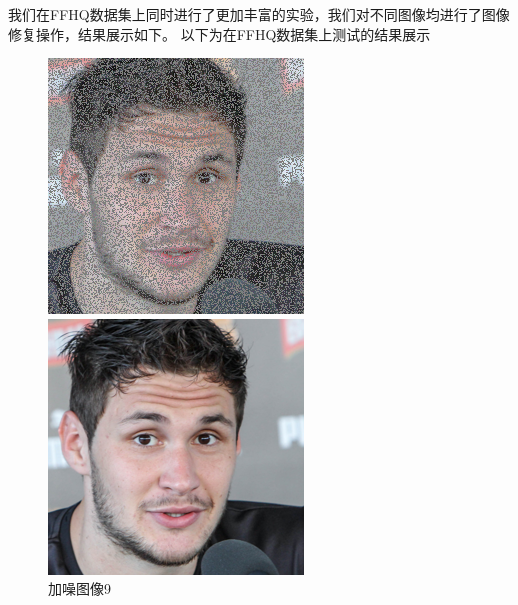 我们在FFHQ数据集上同时进行了更加丰富的实验，我们对不同图像均进行了图像修复操作，结果展示如下。 以下为在FFHQ数据集上测试的结果展示
\begin{figure}[H]
  \centering
  \begin{minipage}[b]{0.3\linewidth}
\includegraphics[width=\linewidth]{Picture/input/00004.png}
    \caption{加噪图像9}
    \label{noised image }
  \end{minipage}
  \hspace{0.1cm} %
   \begin{minipage}[b]{0.3\linewidth}
    \includegraphics[width=\linewidth]{Picture/label/00004.png}

\end{minipage}
\end{figure}

